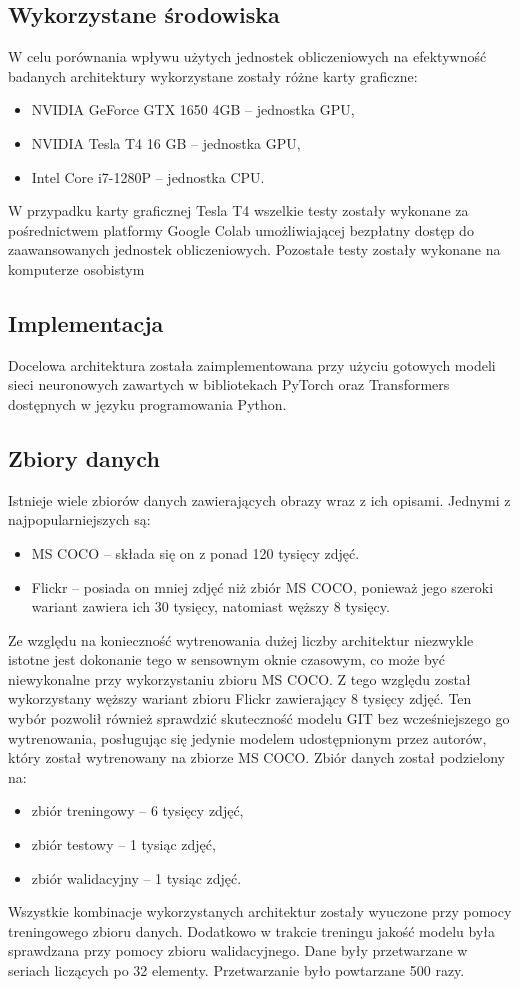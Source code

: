 \subsection{Wykorzystane środowiska}
W celu porównania wpływu użytych jednostek obliczeniowych na efektywność badanych architektury wykorzystane zostały różne karty graficzne:
\begin{itemize}
    \item NVIDIA GeForce GTX 1650 4GB -- jednostka GPU,
    \item NVIDIA Tesla T4 16 GB -- jednostka GPU,
    \item Intel Core i7-1280P -- jednostka CPU.
\end{itemize}
W przypadku karty graficznej Tesla T4 wszelkie testy zostały wykonane za pośrednictwem platformy Google Colab umożliwiającej bezpłatny dostęp do zaawansowanych jednostek obliczeniowych. Pozostałe testy zostały wykonane na komputerze osobistym
\subsection{Implementacja}
Docelowa architektura została zaimplementowana przy użyciu gotowych modeli sieci neuronowych zawartych w bibliotekach PyTorch \cite{pytorch} oraz Transformers \cite{wolf-etal-2020-transformers} dostępnych w języku programowania Python.
\subsection{Zbiory danych}
Istnieje wiele zbiorów danych zawierających obrazy wraz z ich opisami. Jednymi z najpopularniejszych są:
\begin{itemize}
    \item MS COCO \cite{mscoco} -- składa się on z ponad 120 tysięcy zdjęć.
    \item Flickr \cite{flickr30k} -- posiada on mniej zdjęć niż zbiór MS COCO, ponieważ jego szeroki wariant zawiera ich 30 tysięcy, natomiast węższy 8 tysięcy.
\end{itemize}
Ze względu na konieczność wytrenowania dużej liczby architektur niezwykle istotne jest dokonanie tego w sensownym oknie czasowym, co może być niewykonalne przy wykorzystaniu zbioru MS COCO. Z tego względu został wykorzystany węższy wariant zbioru Flickr zawierający 8 tysięcy zdjęć. Ten wybór pozwolił również sprawdzić skuteczność modelu GIT bez wcześniejszego go wytrenowania, posługując się jedynie modelem udostępnionym przez autorów, który został wytrenowany na zbiorze MS COCO.
Zbiór danych został podzielony na:
\begin{itemize}
    \item zbiór treningowy -- 6 tysięcy zdjęć,
    \item zbiór testowy -- 1 tysiąc zdjęć,
    \item zbiór walidacyjny -- 1 tysiąc zdjęć.
\end{itemize}

\noindent Wszystkie kombinacje wykorzystanych architektur zostały wyuczone przy pomocy treningowego zbioru danych. Dodatkowo w trakcie treningu jakość modelu była sprawdzana przy pomocy zbioru walidacyjnego. Dane były przetwarzane w seriach liczących po 32 elementy. Przetwarzanie było powtarzane 500 razy.
